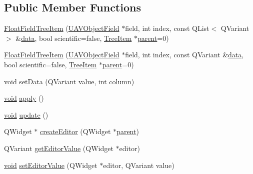 \subsection*{\-Public \-Member \-Functions}
\begin{DoxyCompactItemize}
\item 
\hyperlink{group___u_a_v_object_browser_plugin_ga3b5f17797e8c15bda91990e0224e64fd}{\-Float\-Field\-Tree\-Item} (\hyperlink{class_u_a_v_object_field}{\-U\-A\-V\-Object\-Field} $\ast$field, int index, const \-Q\-List$<$ \-Q\-Variant $>$ \&\hyperlink{group___u_a_v_object_browser_plugin_ga7c5708ae3cbba9c509f497c493beccb6}{data}, bool scientific=false, \hyperlink{class_tree_item}{\-Tree\-Item} $\ast$\hyperlink{group___u_a_v_object_browser_plugin_gaa3a7ba624312b6be70872634db291881}{parent}=0)
\item 
\hyperlink{group___u_a_v_object_browser_plugin_ga2295cc6ac1cdf63b9bf6a35970e79669}{\-Float\-Field\-Tree\-Item} (\hyperlink{class_u_a_v_object_field}{\-U\-A\-V\-Object\-Field} $\ast$field, int index, const \-Q\-Variant \&\hyperlink{group___u_a_v_object_browser_plugin_ga7c5708ae3cbba9c509f497c493beccb6}{data}, bool scientific=false, \hyperlink{class_tree_item}{\-Tree\-Item} $\ast$\hyperlink{group___u_a_v_object_browser_plugin_gaa3a7ba624312b6be70872634db291881}{parent}=0)
\item 
\hyperlink{group___u_a_v_objects_plugin_ga444cf2ff3f0ecbe028adce838d373f5c}{void} \hyperlink{group___u_a_v_object_browser_plugin_ga3af0226a4922471e79087adc2d268710}{set\-Data} (\-Q\-Variant value, int column)
\item 
\hyperlink{group___u_a_v_objects_plugin_ga444cf2ff3f0ecbe028adce838d373f5c}{void} \hyperlink{group___u_a_v_object_browser_plugin_ga4d5f38d08a56c3392536899254daf7d8}{apply} ()
\item 
\hyperlink{group___u_a_v_objects_plugin_ga444cf2ff3f0ecbe028adce838d373f5c}{void} \hyperlink{group___u_a_v_object_browser_plugin_gaf8663356ac74e46312ee8bdfe6470d74}{update} ()
\item 
\-Q\-Widget $\ast$ \hyperlink{group___u_a_v_object_browser_plugin_ga2762101ef0435023c73583b23393a8c2}{create\-Editor} (\-Q\-Widget $\ast$\hyperlink{group___u_a_v_object_browser_plugin_gaa3a7ba624312b6be70872634db291881}{parent})
\item 
\-Q\-Variant \hyperlink{group___u_a_v_object_browser_plugin_gac22e37813e460949e795d4b18c110293}{get\-Editor\-Value} (\-Q\-Widget $\ast$editor)
\item 
\hyperlink{group___u_a_v_objects_plugin_ga444cf2ff3f0ecbe028adce838d373f5c}{void} \hyperlink{group___u_a_v_object_browser_plugin_gadf07cae542668ec439bf1514f07e4983}{set\-Editor\-Value} (\-Q\-Widget $\ast$editor, \-Q\-Variant value)
\end{DoxyCompactItemize}


